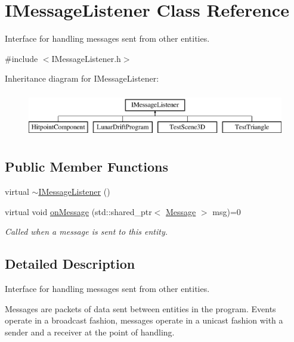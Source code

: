 \hypertarget{class_i_message_listener}{}\section{I\+Message\+Listener Class Reference}
\label{class_i_message_listener}


Interface for handling messages sent from other entities.  




{\ttfamily \#include $<$I\+Message\+Listener.\+h$>$}

Inheritance diagram for I\+Message\+Listener\+:\begin{figure}[H]
\begin{center}
\leavevmode
\includegraphics[height=2.000000cm]{class_i_message_listener}
\end{center}
\end{figure}
\subsection*{Public Member Functions}
\begin{DoxyCompactItemize}
\item 
virtual \hyperlink{class_i_message_listener_af09a1fa8b00d182a92f357ad89a024a5}{$\sim$\+I\+Message\+Listener} ()
\item 
virtual void \hyperlink{class_i_message_listener_aac85f64eeb587944c59e07f5457b1b82}{on\+Message} (std\+::shared\+\_\+ptr$<$ \hyperlink{class_message}{Message} $>$ msg)=0
\begin{DoxyCompactList}\small\item\em Called when a message is sent to this entity. \end{DoxyCompactList}\end{DoxyCompactItemize}


\subsection{Detailed Description}
Interface for handling messages sent from other entities. 

Messages are packets of data sent between entities in the program. Events operate in a broadcast fashion, messages operate in a unicast fashion with a sender and a receiver at the point of handling.

